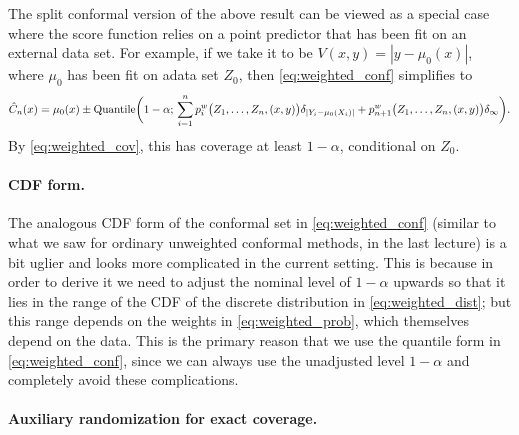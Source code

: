 \documentclass{article}
\begin{document}
The split conformal version of the above result can be viewed as a special case  
where the score function relies on a point predictor that has been fit on an
external data set. For example, if we take it to be $V(x,y) = |y-\mu_0(x)|$,
where $\mu_0$ has been fit on adata set $Z_0$, then \eqref{eq:weighted_conf}
simplifies to       
\[
\hat{C}_n(x) = \mu_0(x) \pm \mathrm{Quantile}\bigg(1-\alpha; \, 
\sum_{i=1}^n p^w_i\big( Z_1,\ldots,Z_n,(x,y) \big) \delta_{|Y_i - \mu_0(X_i)|}
+ p^w_{n+1}\big( Z_1,\ldots,Z_n,(x,y) \big) \delta_\infty \bigg).
\]
By \eqref{eq:weighted_cov}, this has coverage at least $1-\alpha$, conditional
on $Z_0$.   

\paragraph{CDF form.}

The analogous CDF form of the conformal set in \eqref{eq:weighted_conf} (similar
to what we saw for ordinary unweighted conformal methods, in the last lecture)
is a bit uglier and looks more complicated in the current setting. This is
because in order to derive it we need to adjust the nominal level of $1-\alpha$
upwards so that it lies in the range of the CDF of the discrete distribution in
\eqref{eq:weighted_dist}; but this range depends on the weights in
\eqref{eq:weighted_prob}, which themselves depend on the data. This is the
primary reason that we use the quantile form in \eqref{eq:weighted_conf}, since 
we can always use the unadjusted level $1-\alpha$ and completely avoid these
complications. 

\paragraph{Auxiliary randomization for exact coverage.}
\end{document}
